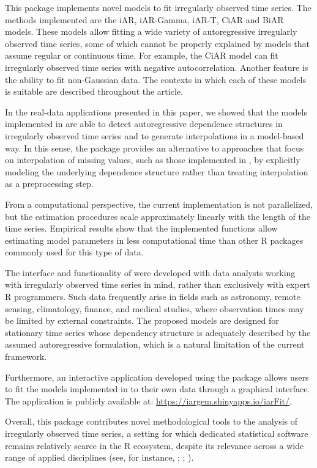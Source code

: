 This package implements novel models to fit irregularly observed time series. The methods implemented are the iAR, iAR-Gamma, iAR-T, CiAR and BiAR models. These models allow fitting a wide variety of autoregressive irregularly observed time series, some of which cannot be properly explained by models that assume regular or continuous time. For example, the CiAR model can fit irregularly observed time series with negative autocorrelation. Another feature is the ability to fit non-Gaussian data. The contexts in which each of these models is suitable are described throughout the article.

In the real-data applications presented in this paper, we showed that the models implemented in  are able to detect autoregressive dependence structures in irregularly observed time series and to generate interpolations in a model-based way. In this sense, the package provides an alternative to approaches that focus on interpolation of missing values, such as those implemented in  \citep{imputeTS}, by explicitly modeling the underlying dependence structure rather than treating interpolation as a preprocessing step.

From a computational perspective, the current implementation is not parallelized, but the estimation procedures scale approximately linearly with the length of the time series. Empirical results show that the implemented functions allow estimating model parameters in less computational time than other R packages commonly used for this type of data.

The interface and functionality of  were developed with data analysts working with irregularly observed time series in mind, rather than exclusively with expert R programmers. Such data frequently arise in fields such as astronomy, remote sensing, climatology, finance, and medical studies, where observation times may be limited by external constraints. The proposed models are designed for stationary time series whose dependency structure is adequately described by the assumed autoregressive formulation, which is a natural limitation of the current framework.

Furthermore, an interactive application developed using the  package \citep{shiny} allows users to fit the models implemented in  to their own data through a graphical interface. The application is publicly available at: \url{https://iargem.shinyapps.io/iarFit/}.

Overall, this package contributes novel methodological tools to the analysis of irregularly observed time series, a setting for which dedicated statistical software remains relatively scarce in the R ecosystem, despite its relevance across a wide range of applied disciplines (see, for instance, \citet{OjedaPalmaEyheramendyElorrieta2023a}; \citet{OjedaPalmaEyheramendyElorrieta2023b}; \citet{GodoyOjeda2025}).

